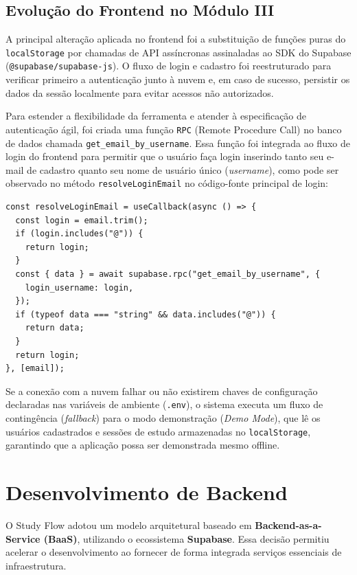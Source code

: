 \documentclass[12pt,a4paper]{article}
\begin{document}
\subsection{Evolução do Frontend no Módulo III}
A principal alteração aplicada no frontend foi a substituição de funções puras do \texttt{localStorage} por chamadas de API assíncronas assinaladas ao SDK do Supabase (\texttt{@supabase/supabase-js}). 
O fluxo de login e cadastro foi reestruturado para verificar primeiro a autenticação junto à nuvem e, em caso de sucesso, persistir os dados da sessão localmente para evitar acessos não autorizados.

Para estender a flexibilidade da ferramenta e atender à especificação de autenticação ágil, foi criada uma função \texttt{RPC} (Remote Procedure Call) no banco de dados chamada \texttt{get\_email\_by\_username}. Essa função foi integrada ao fluxo de login do frontend para permitir que o usuário faça login inserindo tanto seu e-mail de cadastro quanto seu nome de usuário único (\emph{username}), como pode ser observado no método \texttt{resolveLoginEmail} no código-fonte principal de login:

\begin{lstlisting}[caption=Resolução de login por usuário ou e-mail no frontend]
const resolveLoginEmail = useCallback(async () => {
  const login = email.trim();
  if (login.includes("@")) {
    return login;
  }
  const { data } = await supabase.rpc("get_email_by_username", {
    login_username: login,
  });
  if (typeof data === "string" && data.includes("@")) {
    return data;
  }
  return login;
}, [email]);
\end{lstlisting}

Se a conexão com a nuvem falhar ou não existirem chaves de configuração declaradas nas variáveis de ambiente (\texttt{.env}), o sistema executa um fluxo de contingência (\emph{fallback}) para o modo demonstração (\emph{Demo Mode}), que lê os usuários cadastrados e sessões de estudo armazenadas no \texttt{localStorage}, garantindo que a aplicação possa ser demonstrada mesmo offline.

\section{Desenvolvimento de Backend}
O Study Flow adotou um modelo arquitetural baseado em \textbf{Backend-as-a-Service (BaaS)}, utilizando o ecossistema \textbf{Supabase}. Essa decisão permitiu acelerar o desenvolvimento ao fornecer de forma integrada serviços essenciais de infraestrutura.
\end{document}
